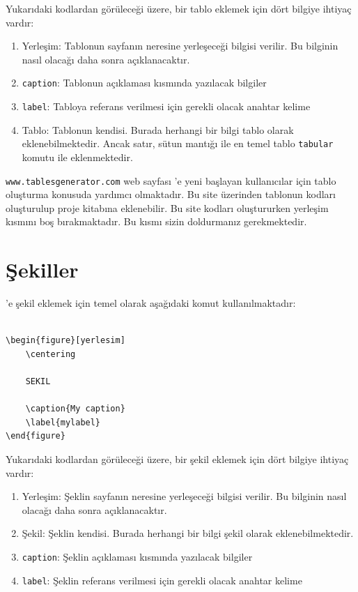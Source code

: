 Yukarıdaki kodlardan görüleceği üzere, bir tablo eklemek için dört bilgiye ihtiyaç vardır: 

\begin{enumerate}
    \item Yerleşim: Tablonun sayfanın neresine yerleşeceği bilgisi verilir. Bu bilginin nasıl olacağı daha sonra açıklanacaktır.
    \item \texttt{caption}: Tablonun açıklaması kısmında yazılacak bilgiler
    \item \texttt{label}: Tabloya referans verilmesi için gerekli olacak anahtar kelime
    \item Tablo: Tablonun kendisi. Burada herhangi bir bilgi tablo olarak eklenebilmektedir. Ancak satır, sütun mantığı ile en temel tablo \texttt{tabular} komutu ile eklenmektedir.
\end{enumerate}

\texttt{www.tablesgenerator.com} web sayfası \latexx'e yeni başlayan kullanıcılar için tablo oluşturma konusuda yardımcı olmaktadır. Bu site üzerinden tablonun kodları oluşturulup proje kitabına eklenebilir. Bu site kodları oluştururken yerleşim kısmını boş bırakmaktadır. Bu kısmı sizin doldurmanız gerekmektedir.

\section{Şekiller}
\latexx'e şekil eklemek için temel olarak aşağıdaki komut kullanılmaktadır:

\begin{verbatim}

\begin{figure}[yerlesim]
    \centering
    
    SEKIL

    \caption{My caption}
    \label{mylabel}
\end{figure}

\end{verbatim}

Yukarıdaki kodlardan görüleceği üzere, bir şekil eklemek için dört bilgiye ihtiyaç vardır: 

\begin{enumerate}
    \item Yerleşim: Şeklin sayfanın neresine yerleşeceği bilgisi verilir. Bu bilginin nasıl olacağı daha sonra açıklanacaktır.
    \item Şekil: Şeklin kendisi. Burada herhangi bir bilgi şekil olarak eklenebilmektedir.
    \item \texttt{caption}: Şeklin açıklaması kısmında yazılacak bilgiler
    \item \texttt{label}: Şeklin referans verilmesi için gerekli olacak anahtar kelime
\end{enumerate}


